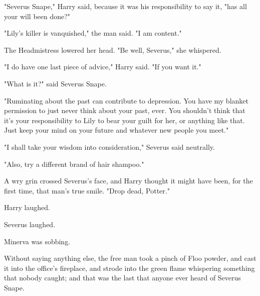 "Severus Snape," Harry said, because it was his responsibility to say it, "has
all your will been done?"

"Lily's killer is vanquished," the man said. "I am content."

The Headmistress lowered her head. "Be well, Severus," she whispered.

"I do have one last piece of advice," Harry said. "If you want it."

"What is it?" said Severus Snape.

"Ruminating about the past can contribute to depression. You have my blanket
permission to just never think about your past, ever. You shouldn't think that
it's your responsibility to Lily to bear your guilt for her, or anything like
that. Just keep your mind on your future and whatever new people you meet."

"I shall take your wisdom into consideration," Severus said neutrally.

"Also, try a different brand of hair shampoo."

A wry grin crossed Severus's face, and Harry thought it might have been, for
the first time, that man's true smile. "Drop dead, Potter."

Harry laughed.

Severus laughed.

Minerva was sobbing.

Without saying anything else, the free man took a pinch of Floo powder, and
cast it into the office's fireplace, and strode into the green flame whispering
something that nobody caught; and that was the last that anyone ever heard of
Severus Snape.
